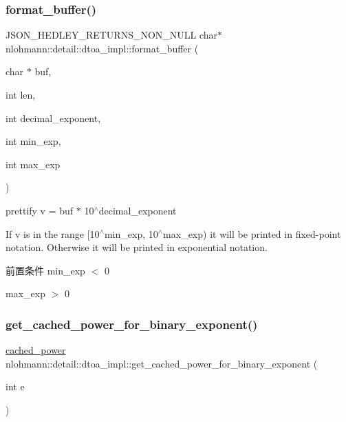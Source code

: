 \subsubsection{\texorpdfstring{format\_buffer()}{format\_buffer()}}
{\footnotesize\ttfamily J\+S\+O\+N\+\_\+\+H\+E\+D\+L\+E\+Y\+\_\+\+R\+E\+T\+U\+R\+N\+S\+\_\+\+N\+O\+N\+\_\+\+N\+U\+LL char$\ast$ nlohmann\+::detail\+::dtoa\+\_\+impl\+::format\+\_\+buffer (\begin{DoxyParamCaption}\item[{char $\ast$}]{buf,  }\item[{int}]{len,  }\item[{int}]{decimal\+\_\+exponent,  }\item[{int}]{min\+\_\+exp,  }\item[{int}]{max\+\_\+exp }\end{DoxyParamCaption})\hspace{0.3cm}{\ttfamily [inline]}}



prettify v = buf $\ast$ 10$^\wedge$decimal\+\_\+exponent 

If v is in the range \mbox{[}10$^\wedge$min\+\_\+exp, 10$^\wedge$max\+\_\+exp) it will be printed in fixed-\/point notation. Otherwise it will be printed in exponential notation.

\begin{DoxyPrecond}{前置条件}
min\+\_\+exp $<$ 0 

max\+\_\+exp $>$ 0 
\end{DoxyPrecond}
\mbox{\label{namespacenlohmann_1_1detail_1_1dtoa__impl_adbf329a18c5cf854a3477327afd2200b}} 
\subsubsection{\texorpdfstring{get\_cached\_power\_for\_binary\_exponent()}{get\_cached\_power\_for\_binary\_exponent()}}
{\footnotesize\ttfamily \mbox{\hyperlink{structnlohmann_1_1detail_1_1dtoa__impl_1_1cached__power}{cached\+\_\+power}} nlohmann\+::detail\+::dtoa\+\_\+impl\+::get\+\_\+cached\+\_\+power\+\_\+for\+\_\+binary\+\_\+exponent (\begin{DoxyParamCaption}\item[{int}]{e }\end{DoxyParamCaption})\hspace{0.3cm}{\ttfamily [inline]}}

